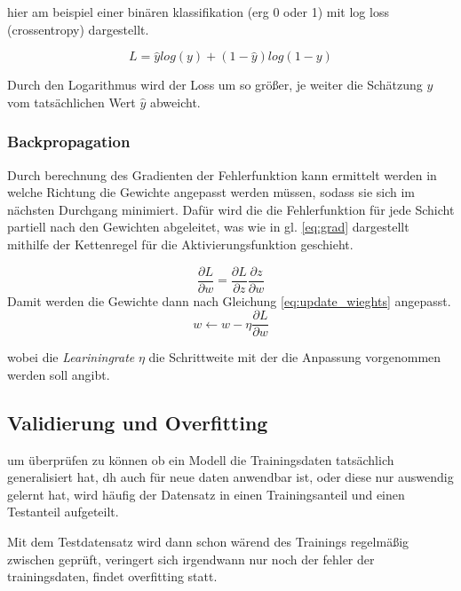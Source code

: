 hier am beispiel einer binären klassifikation (erg 0 oder 1) mit log loss
 (crossentropy) dargestellt.

 \begin{equation}
    \label{eq:crossentropy}
    L = \hat{y}log(y) + (1 - \hat{y})log(1 - y)
\end{equation}

Durch den Logarithmus wird der Loss um so größer, je weiter die Schätzung $y$ vom 
tatsächlichen Wert $\hat{y}$ abweicht.
\subsubsection{Backpropagation}
Durch berechnung des Gradienten der Fehlerfunktion kann ermittelt 
werden in welche Richtung die Gewichte angepasst werden müssen, sodass sie sich 
im nächsten Durchgang minimiert.
Dafür wird die die Fehlerfunktion für jede Schicht partiell nach den 
Gewichten abgeleitet, was wie in gl. \ref{eq:grad} dargestellt mithilfe der 
Kettenregel für die Aktivierungsfunktion geschieht.


\begin{equation}
    \label{eq:grad}
    \frac{\partial L}{\partial w} = \frac{\partial L}{\partial z}\frac{\partial z}{\partial w}
\end{equation}
Damit werden die Gewichte dann nach Gleichung \ref{eq:update_wieghts} angepasst.
\begin{equation}
    \label{eq:update_wieghts}
    w  \leftarrow w - \eta \frac{\partial L}{\partial w}
\end{equation}

wobei die \textit{Leariningrate} $\eta$ die Schrittweite mit der die Anpassung vorgenommen
werden soll angibt.








\subsection{Validierung und Overfitting}

um überprüfen zu können ob ein Modell die Trainingsdaten tatsächlich generalisiert 
hat, dh auch für neue daten anwendbar ist, oder diese nur auswendig gelernt hat, 
wird häufig der Datensatz in einen Trainingsanteil und einen Testanteil aufgeteilt.

Mit dem Testdatensatz wird dann schon wärend des Trainings regelmäßig zwischen geprüft, 
veringert sich irgendwann nur noch der fehler der trainingsdaten, findet overfitting statt.

